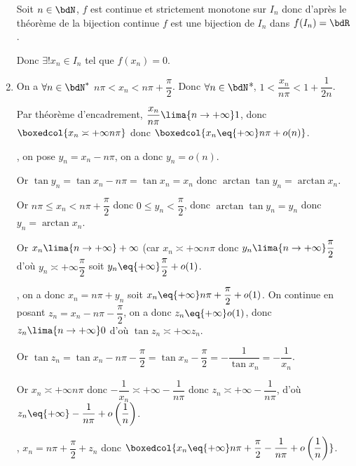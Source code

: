 \documentclass[a4paper,french,bookmarks]{article}
\begin{document}
\begin{exercise}{}{}
\begin{enumerate}
        Soit $n \in \bdN$, $f$ est continue et strictement monotone sur $I_n$ donc d'après le théorème de la bijection continue $f$ est une bijection de $I_n$ dans $f(I_n) = \bdR$.
        
        Donc $\exists ! x_n \in I_n$ tel que $f(x_n) = 0$.
        
        \item On a $\forall n \in \bdN^*$ $n\pi < x_n < n\pi + \dfrac{\pi}{2}$. Donc $\forall n \in \bdN$*, $ 1 < \dfrac{x_n}{n\pi} < 1 + \dfrac{1}{2n}$.
        
        Par théorème d'encadrement, $\dfrac{x_n}{n\pi} \lima{n \to +\infty} 1$, donc $\boxedcol{x_n \asymp{+\infty} n\pi}$ donc $\boxedcol{x_n \eq{+\infty} n\pi + o(n)}$.
        
        , on pose $y_n = x_n - n\pi$, on a donc $y_n = o(n)$.
        
        Or $\tan{y_n} = \tan{x_n - n\pi} = \tan{x_n} = x_n$ donc $\arctan{\tan{y_n}} = \arctan{x_n}$.
        
        Or $n\pi \leq x_n < n\pi + \dfrac{\pi}{2}$ donc $0 \leq y_n < \dfrac{\pi}{2}$, donc $\arctan{\tan{y_n}} = y_n$ donc $y_n = \arctan{x_n}$.
        
        Or $x_n \lima{n \to +\infty} +\infty$ (car $x_n \asymp{+\infty} n\pi$ donc $y_n \lima{n \to +\infty} \dfrac{\pi}{2}$ d'où $y_n \asymp{+\infty} \dfrac{\pi}{2}$ soit $y_n \eq{+\infty} \dfrac{\pi}{2} + o(1)$.
        
        , on a donc $x_n = n\pi + y_n$ soit $x_n \eq{+\infty} n\pi + \dfrac{\pi}{2} + o(1)$.
        On continue en posant $z_n = x_n - n\pi - \dfrac{\pi}{2}$, on a donc $z_n \eq{+\infty} o(1)$, donc $z_n \lima{n \to +\infty} 0$ d'où $\tan{z_n} \asymp{+\infty} z_n$.
        
        Or $\tan{z_n} = \tan{x_n - n\pi - \dfrac{\pi}{2}} = \tan{x_n - \dfrac{\pi}{2}} = -\dfrac{1}{\tan{x_n}} = -\dfrac{1}{x_n}$.
        
         Or $x_n \asymp{+\infty} n\pi$ donc $-\dfrac{1}{x_n} \asymp{+\infty} - \dfrac{1}{n\pi}$ donc $z_n \asymp{+\infty} -\dfrac{1}{n\pi}$, d'où $z_n \eq{+\infty} -\dfrac{1}{n\pi} + o\left(\dfrac{1}{n}\right)$.
         
         , $x_n = n\pi + \dfrac{\pi}{2} + z_n$ donc $\boxedcol{x_n \eq{+\infty} n\pi + \dfrac{\pi}{2} - \dfrac{1}{n\pi} + o\left(\dfrac{1}{n}\right)}$.
    \end{enumerate}
\end{exercise}
\end{document}
